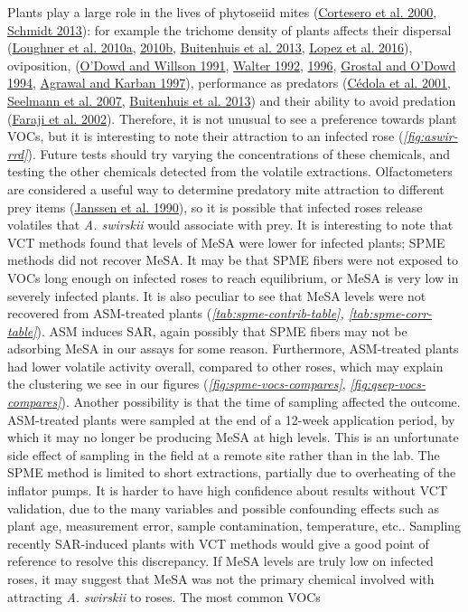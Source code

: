 \documentclass{ufdissertation}[overrideChapters] %
\begin{document}
{Plants play a large role in the lives of phytoseiid mites (\protect\hyperlink{ref-Cortesero2000}{Cortesero et al. 2000}, \protect\hyperlink{ref-Schmidt2013}{Schmidt 2013}): for example the trichome density of plants affects their dispersal (\protect\hyperlink{ref-Loughner2010}{Loughner et al. 2010a}, \protect\hyperlink{ref-Loughner2010a}{2010b}, \protect\hyperlink{ref-Buitenhuis2013}{Buitenhuis et al. 2013}, \protect\hyperlink{ref-Lopez2016}{Lopez et al. 2016}), oviposition, (\protect\hyperlink{ref-ODowd1991}{O'Dowd and Willson 1991}, \protect\hyperlink{ref-Walter1992}{Walter 1992}, \protect\hyperlink{ref-Walter1996}{1996}, \protect\hyperlink{ref-Grostal1994}{Grostal and O'Dowd 1994}, \protect\hyperlink{ref-Agrawal1997}{Agrawal and Karban 1997}), performance as predators (\protect\hyperlink{ref-Cedola2001}{Cédola et al. 2001}, \protect\hyperlink{ref-Seelmann2007}{Seelmann et al. 2007}, \protect\hyperlink{ref-Buitenhuis2013}{Buitenhuis et al. 2013}) and their ability to avoid predation (\protect\hyperlink{ref-Faraji2002}{Faraji et al. 2002}). Therefore, it is not unusual to see a preference towards plant VOCs, but it is interesting to note their attraction to an infected rose (\emph{\ref{fig:aswir-rrd}}). Future tests should try varying the concentrations of these chemicals, and testing the other chemicals detected from the volatile extractions. Olfactometers are considered a useful way to determine predatory mite attraction to different prey items (\protect\hyperlink{ref-Janssen1990}{Janssen et al. 1990}), so it is possible that infected roses release volatiles that \emph{A. swirskii} would associate with prey. It is interesting to note that VCT methods found that levels of MeSA were lower for infected plants; SPME methods did not recover MeSA. It may be that SPME fibers were not exposed to VOCs long enough on infected roses to reach equilibrium, or MeSA is very low in severely infected plants. It is also peculiar to see that MeSA levels were not recovered from ASM-treated plants (\emph{\ref{tab:spme-contrib-table}, \ref{tab:spme-corr-table}}). ASM induces SAR, again possibly that SPME fibers may not be adsorbing MeSA in our assays for some reason. Furthermore, ASM-treated plants had lower volatile activity overall, compared to other roses, which may explain the clustering we see in our figures (\emph{\ref{fig:spme-vocs-compares}}, \emph{\ref{fig:qsep-vocs-compares}}). Another possibility is that the time of sampling affected the outcome. ASM-treated plants were sampled at the end of a 12-week application period, by which it may no longer be producing MeSA at high levels. This is an unfortunate side effect of sampling in the field at a remote site rather than in the lab. The SPME method is limited to short extractions, partially due to overheating of the inflator pumps. It is harder to have high confidence about results without VCT validation, due to the many variables and possible confounding effects such as plant age, measurement error, sample contamination, temperature, etc.. Sampling recently SAR-induced plants with VCT methods would give a good point of reference to resolve this discrepancy. If MeSA levels are truly low on infected roses, it may suggest that MeSA was not the primary chemical involved with attracting \emph{A. swirskii} to roses. The most common VOCs }
\end{document}
